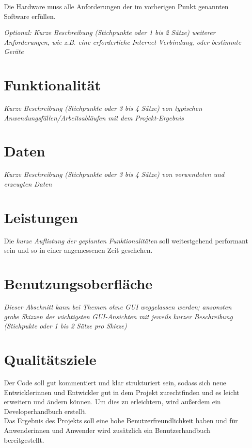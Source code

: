 \documentclass[a4paper,10pt]{scrartcl}
\begin{document}
Die Hardware muss alle Anforderungen der im vorherigen Punkt genannten Software erfüllen.

\textit{Optional: Kurze Beschreibung (Stichpunkte oder 1 bis 2 Sätze) weiterer Anforderungen, wie z.B. eine erforderliche Internet-Verbindung, oder bestimmte Geräte}


\section{Funktionalität}

\textit{Kurze Beschreibung (Stichpunkte oder 3 bis 4 Sätze) von typischen Anwendungsfällen/Arbeitsabläufen mit dem Projekt-Ergebnis}


\section{Daten}

\textit{Kurze Beschreibung (Stichpunkte oder 3 bis 4 Sätze) von verwendeten und erzeugten Daten}


\section{Leistungen}

Die \textit{kurze Auflistung der geplanten Funktionalitäten} soll weitestgehend performant sein und so in einer angemessenen Zeit geschehen.


\section{Benutzungsoberfläche}

\textit{Dieser Abschnitt kann bei Themen ohne GUI weggelassen werden; ansonsten grobe Skizzen der wichtigsten GUI-Ansichten mit jeweils kurzer Beschreibung (Stichpukte oder 1 bis 2 Sätze pro Skizze)}


\section{Qualitätsziele}

Der Code soll gut kommentiert und klar strukturiert sein, sodass sich neue Entwicklerinnen und Entwickler gut in dem Projekt zurechtfinden und es leicht erweitern und ändern können. Um dies zu erleichtern, wird außerdem ein Developerhandbuch erstellt.\\
Das Ergebnis des Projekts soll eine hohe Benutzerfreundlichkeit haben und für Anwenderinnen und Anwender wird zusätzlich ein Benutzerhandbuch bereitgestellt.
\end{document}
